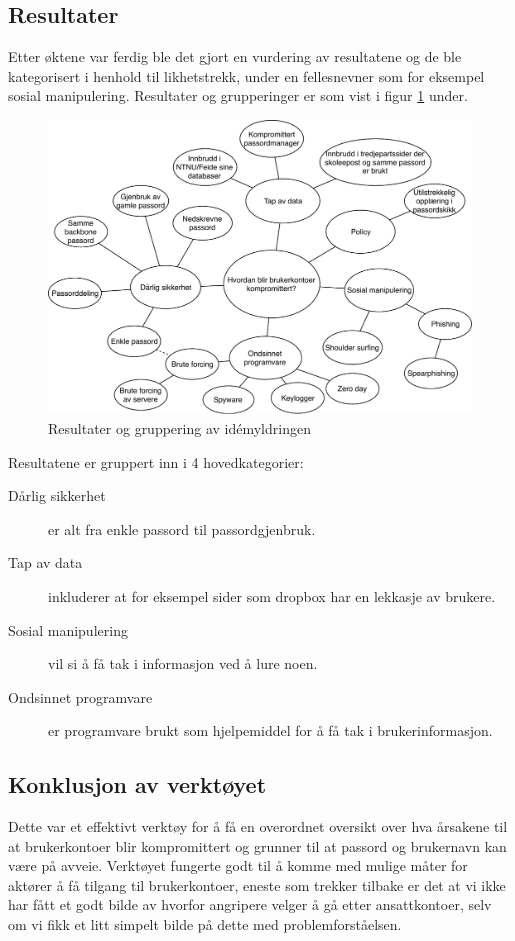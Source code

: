 \subsection{Resultater}
Etter øktene var ferdig ble det gjort en vurdering av resultatene og de ble kategorisert i henhold til likhetstrekk, under en fellesnevner som for eksempel sosial manipulering. Resultater og grupperinger er som vist i figur \ref{fig:idemyldring} under.

\begin{figure}[H]
    \centering
    \includegraphics[scale=0.5]{case_2/bilder/idemyldring.pdf}
    \caption[Idémyldring]{Resultater og gruppering av idémyldringen}
    \label{fig:idemyldring}
\end{figure}

Resultatene er gruppert inn i 4 hovedkategorier:
\begin{description}
    \item [Dårlig sikkerhet] er alt fra enkle passord til passordgjenbruk.
    \item [Tap av data] inkluderer at for eksempel sider som dropbox har en lekkasje av brukere.
    \item [Sosial manipulering] vil si å få tak i informasjon ved å lure noen.
    \item [Ondsinnet programvare] er programvare brukt som hjelpemiddel for å få tak i brukerinformasjon.
\end{description}

\subsection{Konklusjon av verktøyet}
Dette var et effektivt verktøy for å få en overordnet oversikt over hva årsakene til at brukerkontoer blir kompromittert og grunner til at passord og brukernavn kan være på avveie. Verktøyet fungerte godt til å komme med mulige måter for aktører å få tilgang til brukerkontoer, eneste som trekker tilbake er det at vi ikke har fått et godt bilde av hvorfor angripere velger å gå etter ansattkontoer, selv om vi fikk et litt simpelt bilde på dette med problemforståelsen.
